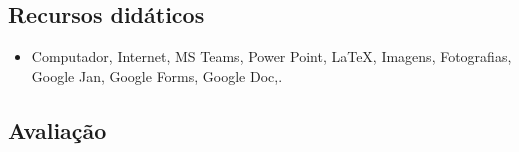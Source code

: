 \documentclass[
	article,			%
	12pt,				%
	twoside,			%
	a4paper,			%
	english,			%
	brazil,				%
	sumario=tradicional
]{abntex2-modelo-plano-de-aula}
\begin{document}





\begin{snugshade}
	\section{Recursos didáticos} %
\end{snugshade}

\begin{itemize}

	\item Computador, Internet, MS Teams, Power Point, \LaTeX, Imagens, Fotografias, Google Jan, Google Forms, Google Doc,.

\end{itemize}

\begin{snugshade}
	\section{Avaliação} %
\end{snugshade}

\end{document}
